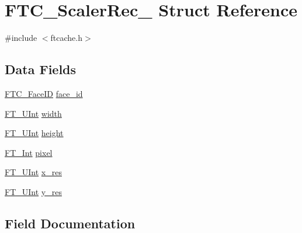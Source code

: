 \hypertarget{struct_f_t_c___scaler_rec__}{}\section{F\+T\+C\+\_\+\+Scaler\+Rec\+\_\+ Struct Reference}
\label{struct_f_t_c___scaler_rec__}


{\ttfamily \#include $<$ftcache.\+h$>$}

\subsection*{Data Fields}
\begin{DoxyCompactItemize}
\item 
\hyperlink{ftcache_8h_a5da66c12c497bf5888638100876c7197}{F\+T\+C\+\_\+\+Face\+ID} \hyperlink{struct_f_t_c___scaler_rec___a8e963aa619409e646558fe7aa272e81f}{face\+\_\+id}
\item 
\hyperlink{fttypes_8h_abcb8db4dbf35d2b55a9e8c7b0926dc52}{F\+T\+\_\+\+U\+Int} \hyperlink{struct_f_t_c___scaler_rec___a11e13d907ca4661bf7c1d98fffecf321}{width}
\item 
\hyperlink{fttypes_8h_abcb8db4dbf35d2b55a9e8c7b0926dc52}{F\+T\+\_\+\+U\+Int} \hyperlink{struct_f_t_c___scaler_rec___a9b3a9b4d7148bbaa4daaae1e1fbb2dbc}{height}
\item 
\hyperlink{fttypes_8h_af90e5fb0d07e21be9fe6faa33f02484c}{F\+T\+\_\+\+Int} \hyperlink{struct_f_t_c___scaler_rec___ab78868341e2d66f17e6f1d77e9e054d2}{pixel}
\item 
\hyperlink{fttypes_8h_abcb8db4dbf35d2b55a9e8c7b0926dc52}{F\+T\+\_\+\+U\+Int} \hyperlink{struct_f_t_c___scaler_rec___a886c7c1230dc5d5e6b3fc32d06274752}{x\+\_\+res}
\item 
\hyperlink{fttypes_8h_abcb8db4dbf35d2b55a9e8c7b0926dc52}{F\+T\+\_\+\+U\+Int} \hyperlink{struct_f_t_c___scaler_rec___accb53c7a9aeebb41c05f48d14d3dfe71}{y\+\_\+res}
\end{DoxyCompactItemize}


\subsection{Field Documentation}
\mbox{\label{struct_f_t_c___scaler_rec___a8e963aa619409e646558fe7aa272e81f}} 
